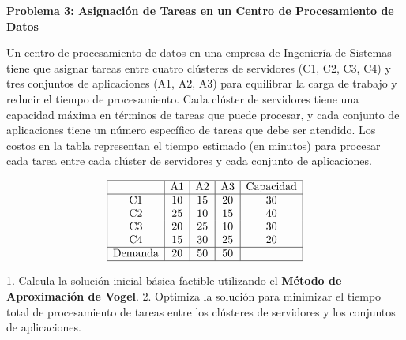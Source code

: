 \documentclass{article}
\begin{document}
\begin{problem}
\textbf{Problema 3: Asignación de Tareas en un Centro de Procesamiento de Datos}

Un centro de procesamiento de datos en una empresa de Ingeniería de Sistemas tiene que asignar tareas entre cuatro clústeres de servidores (C1, C2, C3, C4) y tres conjuntos de aplicaciones (A1, A2, A3) para equilibrar la carga de trabajo y reducir el tiempo de procesamiento. Cada clúster de servidores tiene una capacidad máxima en términos de tareas que puede procesar, y cada conjunto de aplicaciones tiene un número específico de tareas que debe ser atendido. Los costos en la tabla representan el tiempo estimado (en minutos) para procesar cada tarea entre cada clúster de servidores y cada conjunto de aplicaciones.

\[
\begin{array}{|c|c|c|c|c|}
\hline
           & \text{A1} & \text{A2} & \text{A3} & \text{Capacidad} \\
\hline
\text{C1}  & 10        & 15        & 20        & 30        \\
\text{C2}  & 25        & 10        & 15        & 40        \\
\text{C3}  & 20        & 25        & 10        & 30        \\
\text{C4}  & 15        & 30        & 25        & 20        \\
\hline
\text{Demanda} & 20    & 50        & 50        &           \\
\hline
\end{array}
\]

1. Calcula la solución inicial básica factible utilizando el \textbf{Método de Aproximación de Vogel}.
2. Optimiza la solución para minimizar el tiempo total de procesamiento de tareas entre los clústeres de servidores y los conjuntos de aplicaciones.

\end{problem}
\end{document}
